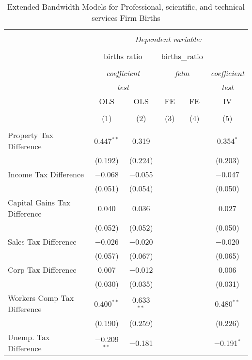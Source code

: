
\begin{table}[!htbp] \centering 
  \caption{Extended Bandwidth Models for  Professional, scientific, and technical services Firm Births} 
  \label{} 
\begin{tabular}{@{\extracolsep{5pt}}lccccc} 
\\[-1.8ex]\hline 
\hline \\[-1.8ex] 
 & \multicolumn{5}{c}{\textit{Dependent variable:}} \\ 
\cline{2-6} 
\\[-1.8ex] & \multicolumn{2}{c}{births ratio} & \multicolumn{2}{c}{births\_ratio} &   \\ 
\\[-1.8ex] & \multicolumn{2}{c}{\textit{coefficient}} & \multicolumn{2}{c}{\textit{felm}} & \textit{coefficient} \\ 
 & \multicolumn{2}{c}{\textit{test}} & \multicolumn{2}{c}{\textit{}} & \textit{test} \\ 
 & OLS & OLS & FE & FE & IV \\ 
\\[-1.8ex] & (1) & (2) & (3) & (4) & (5)\\ 
\hline \\[-1.8ex] 
 Property Tax Difference & 0.447$^{**}$ & 0.319 &  &  & 0.354$^{*}$ \\ 
  & (0.192) & (0.224) &  &  & (0.203) \\ 
  Income Tax Difference & $-$0.068 & $-$0.055 &  &  & $-$0.047 \\ 
  & (0.051) & (0.054) &  &  & (0.050) \\ 
  Capital Gains Tax Difference & 0.040 & 0.036 &  &  & 0.027 \\ 
  & (0.052) & (0.052) &  &  & (0.050) \\ 
  Sales Tax Difference & $-$0.026 & $-$0.020 &  &  & $-$0.020 \\ 
  & (0.057) & (0.067) &  &  & (0.065) \\ 
  Corp Tax Difference & 0.007 & $-$0.012 &  &  & 0.006 \\ 
  & (0.030) & (0.035) &  &  & (0.031) \\ 
  Workers Comp Tax Difference & 0.400$^{**}$ & 0.633$^{**}$ &  &  & 0.480$^{**}$ \\ 
  & (0.190) & (0.259) &  &  & (0.226) \\ 
  Unemp. Tax Difference & $-$0.209$^{**}$ & $-$0.181 &  &  & $-$0.191$^{*}$ \\ 

\end{tabular}
\end{table}
